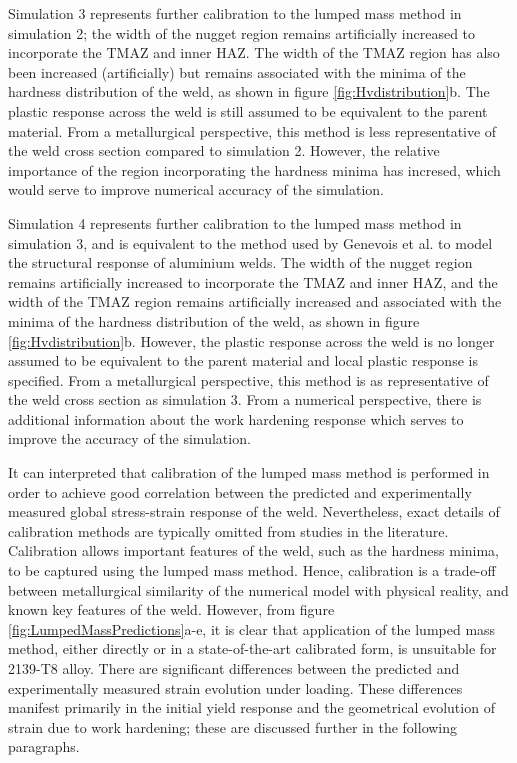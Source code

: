 Simulation 3 represents further calibration to the lumped mass method in simulation 2; the width of the nugget region remains artificially increased to incorporate the TMAZ and inner HAZ. The width of the TMAZ region has also been increased (artificially) but remains associated with the minima of the hardness distribution of the weld, as shown in figure \ref{fig:Hvdistribution}b. The plastic response across the weld is still assumed to be equivalent to the parent material. From a metallurgical perspective, this method is less representative of the weld cross section compared to simulation 2. However, the relative importance of the region incorporating the hardness minima has incresed, which would serve to improve numerical accuracy of the simulation.

Simulation 4 represents further calibration to the lumped mass method in simulation 3, and is equivalent to the method used by Genevois et al. \cite{Genevois2006} to model the structural response of aluminium welds. The width of the nugget region remains artificially increased to incorporate the TMAZ and inner HAZ, and the width of the TMAZ region remains artificially increased and associated with the minima of the hardness distribution of the weld, as shown in figure \ref{fig:Hvdistribution}b. However, the plastic response across the weld is no longer assumed to be equivalent to the parent material and local plastic response is specified. From a metallurgical perspective, this method is as representative of the weld cross section as simulation 3. From a numerical perspective, there is additional information about the work hardening response which serves to improve the accuracy of the simulation.

It can interpreted that calibration of the lumped mass method is performed in order to achieve good correlation between the predicted and experimentally measured global stress-strain response of the weld. Nevertheless, exact details of calibration methods are typically omitted from studies in the literature. Calibration allows important features of the weld, such as the hardness minima, to be captured using the lumped mass method. Hence, calibration is a trade-off between metallurgical similarity of the numerical model with physical reality, and known key features of the weld. However, from figure \ref{fig:LumpedMassPredictions}a-e, it is clear that application of the lumped mass method, either directly or in a state-of-the-art calibrated form, is unsuitable for 2139-T8 alloy. There are significant differences between the predicted and experimentally measured strain evolution under loading. These differences manifest primarily in the initial yield response and the geometrical evolution of strain due to work hardening; these are discussed further in the following paragraphs.

